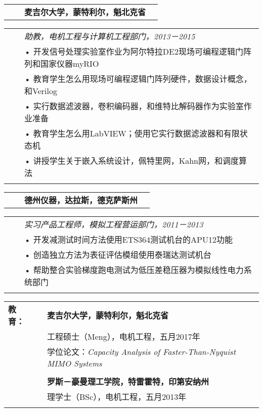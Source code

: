 \documentclass{minimal}
\begin{document}
\begin{CJK*}{UTF8}{gbsn}
\begin{tabular}{ p{1.5cm} p{1cm} p{10cm} >{\raggedleft\arraybackslash}p{3cm} }
& & \textbf{麦吉尔大学，蒙特利尔，魁北克省} & \\
\end{tabular}

\begin{tabular}{ p{1.5cm} p{1cm} p{16cm} }
& & \textit{助教，电机工程与计算机工程部门，2013－2015}\\
& & • 开发信号处理实验室作业为阿尔特拉DE2现场可编程逻辑门阵列和国家仪器myRIO\\
& & • 教育学生怎么用现场可编程逻辑门阵列硬件，数据设计概念，和Verilog\\
& & • 实行数据滤波器，卷积编码器，和维特比解码器作为实验室作业准备\\
& & • 教育学生怎么用LabVIEW；使用它实行数据滤波器和有限状态机\\
& & • 讲授学生关于嵌入系统设计，佩特里网，Kahn网，和调度算法\\
& & \\
\end{tabular}

\pagebreak

\begin{tabular}{ p{1.5cm} p{1cm} p{10cm} >{\raggedleft\arraybackslash}p{3cm} }
& & \textbf{德州仪器，达拉斯，德克萨斯州} & \\
\end{tabular}

\begin{tabular}{ p{1.5cm} p{1cm} p{16cm} }
& & \textit{实习产品工程师，模拟工程营运部门，2011－2013}\\
& & • 开发减测试时间方法使用ETS364测试机台的APU12功能\\
& & • 创造独立方法为表征评估模组使用泰瑞达测试机台\\
& & • 帮助整合实验梯度跑电测试为低压差稳压器为模拟线性电力系统部门\\
& & \\
\end{tabular}

\begin{tabular}{ p{1.5cm} p{1cm} p{16cm} }
\textbf{教育：} & & \textbf{麦吉尔大学，蒙特利尔，魁北克省} \\
& & 工程硕士（Meng），电机工程，五月2017年\\
& & 学位论文：\textit{Capacity Analysis of Faster-Than-Nyquist MIMO Systems}\\
& & \\
& & \textbf{罗斯－豪曼理工学院，特雷霍特，印第安纳州} \\
& & 理学士（BSc），电机工程，五月2013年\\
& & \\
\end{tabular}


\end{CJK*}
\end{document}
